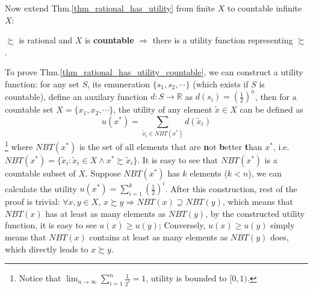 Now extend Thm.\ref{thm_rational_has_utility} from finite $X$ to countable infinite $X$:
\begin{theorem}\label{thm_rational_has_utility_countable}
    $\succsim$ is rational and $X$ is \textbf{countable} $\Rightarrow$ there is a utility function representing $\succsim$.
\end{theorem}

To prove Thm.\ref{thm_rational_has_utility_countable}, we can construct a utility function: for any set $S$, its emuneration $\{s_1,s_2,\cdots\}$ (which exists if $S$ is countable), define an auxilary function $d:S\rightarrow \mathbb{R}$ as $d(s_i)=\left(\frac{1}{2}\right)^n$, then for a countable set $X=\{x_1,x_2,\cdots\}$, the utility of any element $\tilde{x}\in X$ can be defined as 
$$u(x^*)=\sum_{\tilde{x}_i\in NBT(x^*)}d(\tilde{x}_i)$$\footnote{Notice that $\lim_{n\rightarrow\infty}\sum_{i=1}^n\frac{1}{2^i}=1$, utility is bounded to $[0,1)$.}
where $NBT(x^*)$ is the set of all elements that are \textbf{n}ot \textbf{b}etter \textbf{t}han $x^*$, i.e. $NBT(x^*)=\{\tilde{x}_i:\tilde{x}_i\in X \land x^*\succsim \tilde{x}_i\}$. It is easy to see that $NBT(x^*)$ is a countable subset of $X$. Suppose $NBT(x^*)$ has $k$ elements ($k<n$), we can calculate the utility $u(x^*)=\sum_{i=1}^k\left(\frac{1}{2}\right)^i$. After this construction,
rest of the proof is trivial: $\forall x,y\in X$, $x\succsim y\Rightarrow NBT(x)\supseteq NBT(y)$, which means that $NBT(x)$ has at least as many elements as $NBT(y)$, by the constructed utility function, it is easy to see $u(x)\geq u(y)$; Conversely, $u(x)\geq u(y)$ simply means that $NBT(x)$ contains at least as many elements as $NBT(y)$ does, which directly leads to $x\succsim y$.

